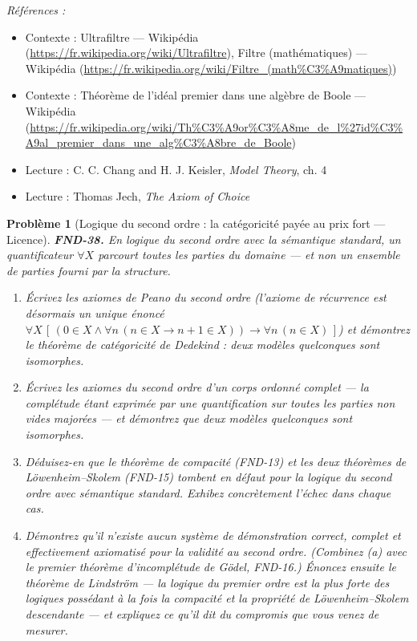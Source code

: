 \documentclass[11pt]{article}
\newtheorem{problem}{Problème}
\newenvironment{refs}{\par\small\noindent\emph{Références :}\begin{itemize}\setlength\itemsep{0pt}}{\end{itemize}\normalsize}
\begin{document}
\begin{refs}
\item Contexte : Ultrafiltre --- Wikipédia (\url{https://fr.wikipedia.org/wiki/Ultrafiltre}), Filtre (mathématiques) --- Wikipédia (\url{https://fr.wikipedia.org/wiki/Filtre_(math%C3%A9matiques)})
\item Contexte : Théorème de l'idéal premier dans une algèbre de Boole --- Wikipédia (\url{https://fr.wikipedia.org/wiki/Th%C3%A9or%C3%A8me_de_l%27id%C3%A9al_premier_dans_une_alg%C3%A8bre_de_Boole})
\item Lecture : C. C. Chang and H. J. Keisler, \textit{Model Theory}, ch. 4
\item Lecture : Thomas Jech, \textit{The Axiom of Choice}
\end{refs}

\bigskip

\begin{problem}[{Logique du second ordre : la catégoricité payée au prix fort --- Licence}]
\textbf{FND-38.} En logique du second ordre avec la sémantique \textit{standard}, un
quantificateur $ \forall X $ parcourt \textit{toutes} les parties du domaine --- et non un ensemble
de parties fourni par la structure.
\begin{enumerate}
\item[(a)] Écrivez les axiomes de Peano du second ordre (l'axiome de récurrence est désormais un unique
énoncé
$ \forall X \, [\,(0 \in X \wedge \forall n\,(n \in X \to n+1 \in X)) \to \forall n\, (n \in X)\,] $)
et démontrez le théorème de catégoricité de Dedekind : deux modèles quelconques sont isomorphes.
\item[(b)] Écrivez les axiomes du second ordre d'un corps ordonné complet --- la complétude étant exprimée
par une quantification sur toutes les parties non vides majorées --- et démontrez que deux modèles
quelconques sont isomorphes.
\item[(c)] Déduisez-en que le théorème de compacité (FND-13) et les deux théorèmes de Löwenheim--Skolem
(FND-15) \textit{tombent en défaut} pour la logique du second ordre avec sémantique standard.
Exhibez concrètement l'échec dans chaque cas.
\item[(d)] Démontrez qu'il n'existe aucun système de démonstration correct, complet et effectivement
axiomatisé pour la validité au second ordre. (Combinez (a) avec le premier théorème d'incomplétude
de Gödel, FND-16.) Énoncez ensuite le théorème de Lindström --- la logique du premier ordre est la
plus forte des logiques possédant à la fois la compacité et la propriété de Löwenheim--Skolem
descendante --- et expliquez ce qu'il dit du compromis que vous venez de mesurer.
\end{enumerate}

\end{problem}
\end{document}
